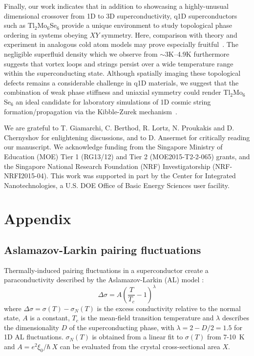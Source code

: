\documentclass[prb,twocolumn,showpacs,preprintnumbers,amsmath,amssymb,floatfix,groupedaddress,superscriptaddress,aps,10pt]{revtex4-1}
\newcommand{\Tl}{Tl$_2$Mo$_6$Se$_6$}
\begin{document}
{{Finally, our work indicates that in addition to showcasing a highly-unusual dimensional crossover from 1D to 3D superconductivity, q1D superconductors such as {\Tl} provide a unique environment to study topological phase ordering in systems obeying $XY$ symmetry. Here, comparison with theory and experiment in analogous cold atom models may prove especially fruitful~\cite{Iskin2009}.  The negligible superfluid density which we observe from $\sim$3K--4.9K furthermore suggests that vortex loops and strings persist over a wide temperature range within the superconducting state.  Although spatially imaging these topological defects remains a considerable challenge in q1D materials, we suggest that the combination of weak phase stiffness and uniaxial symmetry could render {\Tl} an ideal candidate for laboratory simulations of 1D cosmic string formation/propagation via the Kibble-Zurek mechanism~\cite{Williams1999}.     

\begin{acknowledgments}
We are grateful to T. Giamarchi, C. Berthod,  R. Lortz, N. Proukakis and D. Chernyshov for enlightening discussions, and to D. Ansermet for critically reading our manuscript. We acknowledge funding from the Singapore Ministry of Education (MOE) Tier 1 (RG13/12) and Tier 2 (MOE2015-T2-2-065) grants, and the Singapore National Research Foundation (NRF) Investigatorship (NRF-NRFI2015-04). This work was supported in part by the Center for Integrated Nanotechnologies, a U.S. DOE Office of Basic Energy Sciences user facility.
\end{acknowledgments}

\section{Appendix}

\subsection{Aslamazov-Larkin pairing fluctuations}
Thermally-induced pairing fluctuations in a superconductor create a paraconductivity described by the Aslamazov-Larkin (AL) model \cite{Aslamazov1968,Sharma1995}:
\begin{equation} \label{ALfluctuation}
\Delta\sigma=A\left(\frac{T}{T_c}-1\right)^{\lambda}
\end{equation}
where $\Delta\sigma = \sigma(T)-\sigma_{N}(T)$ is the excess conductivity relative to the normal state, $A$ is a constant, $T_c$ is the mean-field transition temperature and $\lambda$ describes the dimensionality $D$ of the superconducting phase, with $\lambda=2-D/2=1.5$ for 1D AL fluctuations. $\sigma_{N}(T)$ is obtained from a linear fit to $\sigma(T)$ from 7-10~K and $A=e^2\xi_0/\hbar~X$ can be evaluated from the crystal cross-sectional area $X$.  

}}
\end{document}
